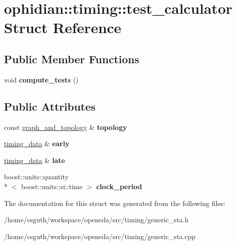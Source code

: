 \hypertarget{structophidian_1_1timing_1_1test__calculator}{\section{ophidian\-:\-:timing\-:\-:test\-\_\-calculator Struct Reference}
\label{structophidian_1_1timing_1_1test__calculator}
}
\subsection*{Public Member Functions}
\begin{DoxyCompactItemize}
\item 
\hypertarget{structophidian_1_1timing_1_1test__calculator_a5f8d4d44e99db39a32e2ac4bb7413bb8}{void {\bfseries compute\-\_\-tests} ()}\label{structophidian_1_1timing_1_1test__calculator_a5f8d4d44e99db39a32e2ac4bb7413bb8}

\end{DoxyCompactItemize}
\subsection*{Public Attributes}
\begin{DoxyCompactItemize}
\item 
\hypertarget{structophidian_1_1timing_1_1test__calculator_a32ad1b5a7adb0e297172edacc1da1374}{const \hyperlink{structophidian_1_1timing_1_1graph__and__topology}{graph\-\_\-and\-\_\-topology} \& {\bfseries topology}}\label{structophidian_1_1timing_1_1test__calculator_a32ad1b5a7adb0e297172edacc1da1374}

\item 
\hypertarget{structophidian_1_1timing_1_1test__calculator_af0b07b49d10ef6ef40f129e9eb1d5558}{\hyperlink{structophidian_1_1timing_1_1timing__data}{timing\-\_\-data} \& {\bfseries early}}\label{structophidian_1_1timing_1_1test__calculator_af0b07b49d10ef6ef40f129e9eb1d5558}

\item 
\hypertarget{structophidian_1_1timing_1_1test__calculator_abbbadad93c26611d4787b3956e2e94c8}{\hyperlink{structophidian_1_1timing_1_1timing__data}{timing\-\_\-data} \& {\bfseries late}}\label{structophidian_1_1timing_1_1test__calculator_abbbadad93c26611d4787b3956e2e94c8}

\item 
\hypertarget{structophidian_1_1timing_1_1test__calculator_a6e96f28e077db11869ae129a398f4533}{boost\-::units\-::quantity\\*
$<$ boost\-::units\-::si\-::time $>$ {\bfseries clock\-\_\-period}}\label{structophidian_1_1timing_1_1test__calculator_a6e96f28e077db11869ae129a398f4533}

\end{DoxyCompactItemize}


The documentation for this struct was generated from the following files\-:\begin{DoxyCompactItemize}
\item 
/home/csguth/workspace/openeda/src/timing/generic\-\_\-sta.\-h\item 
/home/csguth/workspace/openeda/src/timing/generic\-\_\-sta.\-cpp\end{DoxyCompactItemize}
